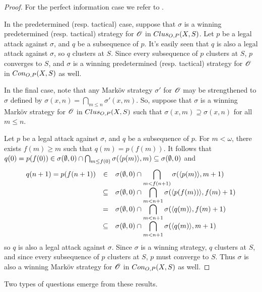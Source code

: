 \begin{proof}
  For the perfect information case we refer to \cite{MR0413049}.

  In the predetermined (resp. tactical) case, suppose that $\sigma$ is a
  winning predetermined (resp. tactical) strategy for $\mathscr{O}$ in
  $Clus_{O,P}(X,S)$. Let $p$ be a legal attack against $\sigma$, and $q$ be a
  subsequence of $p$. It's easily seen that $q$ is also a legal attack against
  $\sigma$, so $q$ clusters at $S$. Since every subsequence of $p$ clusters
  at $S$, $p$ converges to $S$, and $\sigma$ is a winning predetermined
  (resp. tactical) strategy for $\mathscr{O}$ in $Con_{O,P}(X,S)$ as well.

  In the final case, note that any Mark\"ov strategy $\sigma'$ for $\mathscr{O}$ may
  be strengthened to $\sigma$ defined by
  $\sigma(x,n)=\bigcap_{m\leq n}\sigma'(x,m)$.
  So, suppose that $\sigma$ is a winning Mark\"ov strategy for $\mathscr{O}$ in
  $Clus_{O,P}(X,S)$ such that $\sigma(x,m)\supseteq\sigma(x,n)$ for all
  $m\leq n$.

  Let $p$ be a legal attack against $\sigma$, and $q$ be a subsequence of $p$.
  For $m<\omega$, there exists $f(m)\geq m$ such that $q(m)=p(f(m))$. It follows
  that
    $
      q(0)=p(f(0))
        \in
      \sigma(\emptyset,0)\cap \bigcap_{m\leq f(0)}\sigma(\langle p(m)\rangle,m)
        \subseteq
      \sigma(\emptyset,0)
    $
  and
    \[
      \begin{array}{rcl}
        q(n+1)=p(f(n+1)) &
          \in &
        \displaystyle
        \sigma(\emptyset,0)\cap \bigcap_{m<f(n+1)}\sigma(\langle p(m)\rangle,m+1) \\ &
          \subseteq &
        \displaystyle
        \sigma(\emptyset,0)\cap \bigcap_{m<n+1}\sigma(\langle p(f(m))\rangle,f(m)+1) \\ &
          = &
        \displaystyle
        \sigma(\emptyset,0)\cap \bigcap_{m<n+1}\sigma(\langle q(m)\rangle,f(m)+1) \\ &
          \subseteq &
        \displaystyle
        \sigma(\emptyset,0)\cap \bigcap_{m<n+1}\sigma(\langle q(m)\rangle,m+1)
      \end{array}
    \]
  so $q$ is also a legal attack against $\sigma$. Since $\sigma$ is a winning
  strategy, $q$ clusters at $S$, and since every subsequence of $p$ clusters
  at $S$, $p$ must converge to $S$. Thus $\sigma$ is also a winning Mark\"ov
  strategy for $\mathscr{O}$ in $Con_{O,P}(X,S)$ as well.
\end{proof}

Two types of questions emerge from these results.

